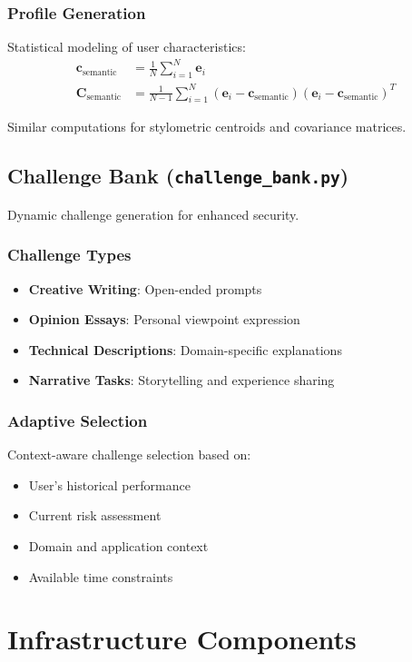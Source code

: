\documentclass[12pt,a4paper]{article}
\begin{document}
\subsubsection{Profile Generation}
Statistical modeling of user characteristics:
\begin{align}
\mathbf{c}_{\text{semantic}} &= \frac{1}{N} \sum_{i=1}^{N} \mathbf{e}_i \\
\mathbf{C}_{\text{semantic}} &= \frac{1}{N-1} \sum_{i=1}^{N} (\mathbf{e}_i - \mathbf{c}_{\text{semantic}})(\mathbf{e}_i - \mathbf{c}_{\text{semantic}})^T
\end{align}

Similar computations for stylometric centroids and covariance matrices.

\subsection{Challenge Bank (\texttt{challenge\_bank.py})}

Dynamic challenge generation for enhanced security.

\subsubsection{Challenge Types}
\begin{itemize}
    \item \textbf{Creative Writing}: Open-ended prompts
    \item \textbf{Opinion Essays}: Personal viewpoint expression
    \item \textbf{Technical Descriptions}: Domain-specific explanations
    \item \textbf{Narrative Tasks}: Storytelling and experience sharing
\end{itemize}

\subsubsection{Adaptive Selection}
Context-aware challenge selection based on:
\begin{itemize}
    \item User's historical performance
    \item Current risk assessment
    \item Domain and application context
    \item Available time constraints
\end{itemize}

\section{Infrastructure Components}
\end{document}

